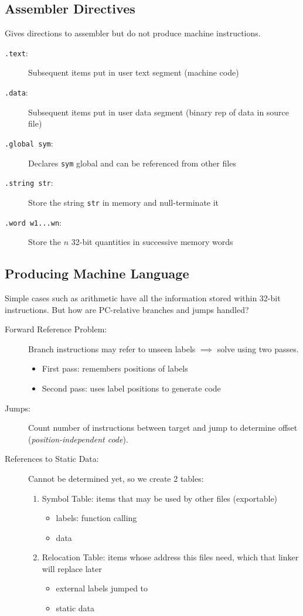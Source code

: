 \subsection{Assembler Directives}
Gives directions to assembler but do not produce machine instructions.
\begin{description}
    \item[\texttt{.text}:] Subsequent items put in user text segment (machine code)
    \item[\texttt{.data}:] Subsequent items put in user data segment (binary rep of data in source file)
    \item[\texttt{.global sym}:] Declares \texttt{sym} global and can be referenced from other files
    \item[\texttt{.string str}:] Store the string \texttt{str} in memory and null-terminate it
    \item[\texttt{.word w1...wn}:] Store the $n$ 32-bit quantities in successive memory words
\end{description}

\subsection{Producing Machine Language}
Simple cases such as arithmetic have all the information stored within 32-bit instructions. But how are PC-relative branches and jumps handled?
\begin{description}
    \item[Forward Reference Problem:] Branch instructions may refer to unseen labels $\implies$ solve using two passes.
    \begin{itemize}
        \item First pass: remembers positions of labels
        \item Second pass: uses label positions to generate code
    \end{itemize}
    \item[Jumps:] Count number of instructions between target and jump to determine offset (\emph{position-independent code}).
    \item[References to Static Data:] Cannot be determined yet, so we create 2 tables:
    \begin{enumerate}
        \item Symbol Table: items that may be used by other files (exportable)
        \begin{itemize}
            \item labels: function calling
            \item data
        \end{itemize}
        \item Relocation Table: items whose address this files need, which that linker will replace later
        \begin{itemize}
            \item external labels jumped to
            \item static data
        \end{itemize}
    \end{enumerate}
\end{description}


